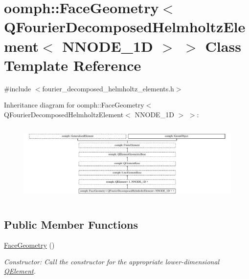 \hypertarget{classoomph_1_1FaceGeometry_3_01QFourierDecomposedHelmholtzElement_3_01NNODE__1D_01_4_01_4}{}\section{oomph\+:\+:Face\+Geometry$<$ Q\+Fourier\+Decomposed\+Helmholtz\+Element$<$ N\+N\+O\+D\+E\+\_\+1D $>$ $>$ Class Template Reference}
\label{classoomph_1_1FaceGeometry_3_01QFourierDecomposedHelmholtzElement_3_01NNODE__1D_01_4_01_4}


{\ttfamily \#include $<$fourier\+\_\+decomposed\+\_\+helmholtz\+\_\+elements.\+h$>$}

Inheritance diagram for oomph\+:\+:Face\+Geometry$<$ Q\+Fourier\+Decomposed\+Helmholtz\+Element$<$ N\+N\+O\+D\+E\+\_\+1D $>$ $>$\+:\begin{figure}[H]
\begin{center}
\leavevmode
\includegraphics[height=4.041237cm]{classoomph_1_1FaceGeometry_3_01QFourierDecomposedHelmholtzElement_3_01NNODE__1D_01_4_01_4}
\end{center}
\end{figure}
\subsection*{Public Member Functions}
\begin{DoxyCompactItemize}
\item 
\hyperlink{classoomph_1_1FaceGeometry_3_01QFourierDecomposedHelmholtzElement_3_01NNODE__1D_01_4_01_4_a2e4879990dad5a34d90472e6a224020b}{Face\+Geometry} ()
\begin{DoxyCompactList}\small\item\em Constructor\+: Call the constructor for the appropriate lower-\/dimensional \hyperlink{classoomph_1_1QElement}{Q\+Element}. \end{DoxyCompactList}\end{DoxyCompactItemize}
